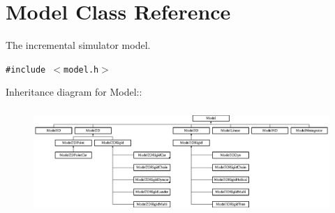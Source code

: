 \section{Model  Class Reference}
\label{classModel}
The incremental simulator model. 


{\tt \#include $<$model.h$>$}

Inheritance diagram for Model::\begin{figure}[H]
\begin{center}
\leavevmode
\includegraphics[height=3.97163cm]{classModel}
\end{center}
\end{figure}
